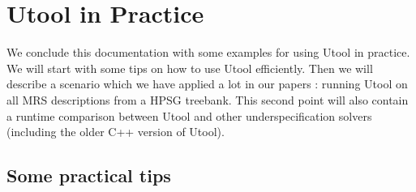 
\section{Utool in Practice} \label{sec:practice}

We conclude this documentation with some examples for using Utool in
practice. We will start with some tips on how to use Utool
efficiently. Then we will describe a scenario which we have applied a
lot in our papers \cite{FucKolNieTha04,FliKolTha05,KolTha05b}: running
Utool on all MRS descriptions from a HPSG treebank. This second point
will also contain a runtime comparison between Utool and other
underspecification solvers (including the older C++ version of
Utool). 

\subsection{Some practical tips}


